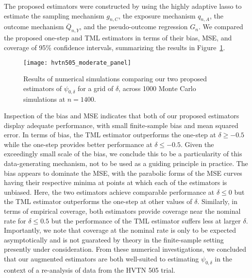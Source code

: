 The proposed estimators were constructed by using the highly adaptive lasso to
estimate the sampling mechanism $g_{n,C}$, the exposure mechanism $q_{n,A}$, the
outcome mechanism $\overline{Q}_{n,Y}$, and the pseudo-outcome regression $G_n$.
We compared the proposed one-step and TML estimators in terms of their bias,
MSE, and coverage of 95\% confidence intervals, summarizing the results in
Figure~\ref{fig:hvtn_sim_moderate}.
\begin{figure}[H]
  \centering
  \texttt{[image: hvtn505\_moderate\_panel]}
  \caption{Results of numerical simulations comparing our two proposed
  estimators of $\psi_{0,\delta}$ for a grid of $\delta$, across 1000 Monte
  Carlo simulations at $n = 1400$.}
  \label{fig:hvtn_sim_moderate}
\end{figure}


Inspection of the bias and MSE indicates that both of our proposed estimators
display adequate performance, with small finite-sample bias and mean squared
error. In terms of bias, the TML estimator outperforms the one-step at $\delta
\geq -0.5$ while the one-step provides better performance at $\delta \leq -0.5$.
Given the exceedingly small scale of the bias, we conclude this to be
a particularity of this data-generating mechanism, not to be used as a guiding
principle in practice. The bias appears to dominate the MSE, with the parabolic
forms of the MSE curves having their respective minima at points at which each
of the estimators is unbiased. Here, the two estimators achieve comparable
performance at $\delta \leq 0$ but the TML estimator outperforms the one-step at
other values of $\delta$. Similarly, in terms of empirical coverage, both
estimators provide coverage near the nominal rate for $\delta \leq 0.5$ but the
performance of the TML estimator suffers less at larger $\delta$. Importantly,
we note that coverage at the nominal rate is only to be expected asymptotically
and is not guarateed by theory in the finite-sample setting presently under
consideration. From these numerical investigations, we concluded that our
augmented estimators are both well-suited to estimating $\psi_{0,\delta}$ in the
context of a re-analysis of data from the HVTN 505 trial.

